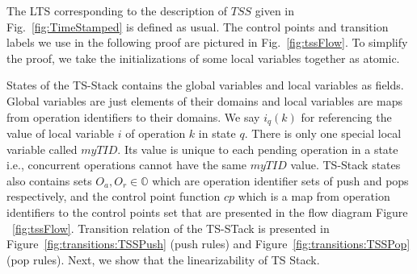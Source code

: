 The LTS corresponding to the description of $TSS$ given in Fig.~\ref{fig:TimeStamped} is defined as usual. The control points and transition labels we use in the following proof are pictured in Fig.~\ref{fig:tssFlow}. To simplify the proof, we take the initializations of some local variables together as atomic.

States of the TS-Stack contains the global variables and local variables as fields. Global variables are just elements of their domains and local variables are maps from operation identifiers to their domains. We say $i_q(k)$ for referencing the value of local variable $i$ of operation $k$ in state $q$. There is only one special local variable called $myTID$. Its value is unique to each pending operation in a state i.e., concurrent operations cannot have the same $myTID$ value. TS-Stack states also contains sets $O_a, O_r \in \mathbb{O}$ which are operation identifier sets of push and pops respectively, and the control point function $cp$ which is a map from operation identifiers to the control points set that are presented in the flow diagram Figure ~\ref{fig:tssFlow}. Transition relation of the TS-STack is presented in Figure~\ref{fig:transitions:TSSPush} (push rules) and Figure~\ref{fig:transitions:TSSPop} (pop rules).
Next, we show that the linearizability of TS Stack.

